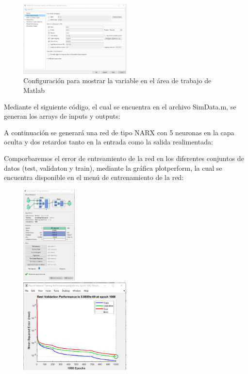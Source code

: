 \documentclass{article}
\begin{document}
\begin{figure}[h]
\caption{Configuración para mostrar la variable en el área de trabajo de Matlab}
\centering
\includegraphics[width=0.5\textwidth]{imagenes/ConfigOut.png}
\end{figure}
\newpage
Mediante el siguiente código, el cual se encuentra en el archivo SimData.m, se generan los arrays de inputs y outputs:


A continuación se generará una red de tipo NARX con 5 neuronas en la capa oculta y dos retardos tanto en la entrada como la salida realimentada:


Comporbaremos el error de entreamiento de la red en los diferentes conjuntos de datos (test, validaton y train), mediante la gráfica plotperform, la cual se encuentra disponible en el menú de entrenamiento de la red:



\begin{figure}
    \begin{sufigure}
        \includegraphics[width=0.25\textwidth]{imagenes/EX1_VIEWTRAIN.png}
    \end{sufigure}
    \begin{sufigure}
        \includegraphics[width=0.5\textwidth]{imagenes/EX1_PERFORMANCE.png}
    \end{sufigure}
\end{figure}
\end{document}
